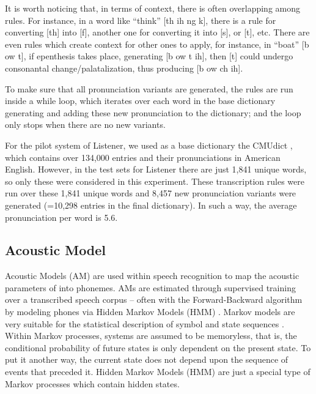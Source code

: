 \documentclass[twocolumn]{bmcart}%
\begin{document}
It is worth noticing that, in terms of context, there is often overlapping among rules. For instance, in a word like ``think'' [th ih ng k], there is a rule for converting [th] into [f], another one for converting it into [s], or [t], etc. There are even rules which create context for other ones to apply, for instance, in ``boat'' [b ow t], if epenthesis takes place, generating [b ow t ih], then [t] could undergo consonantal change/palatalization, thus producing [b ow ch ih].

To make sure that all pronunciation variants are generated, the rules are run inside a while loop, which iterates over each word in the base dictionary generating and adding these new pronunciation to the dictionary; and the loop only stops when there are no new variants.

For the pilot system of Listener, we used as a base dictionary the CMUdict \cite{CMUDict2008}, which contains over 134,000 entries and their pronunciations in American English. However, in the test sets for Listener there are just 1,841 unique words, so only these were considered in this experiment. These transcription rules were run over these 1,841 unique words and 8,457 new pronunciation variants were generated (=10,298 entries in the final dictionary). In such a way, the average pronunciation per word is 5.6. 

\subsection*{\textbf{Acoustic Model}}

Acoustic Models (AM) are used within speech recognition to map the acoustic parameters of into phonemes.  AMs are estimated through supervised training over a transcribed speech corpus -- often with the Forward-Backward algorithm by modeling phones via Hidden Markov Models (HMM) \cite{Rabiner1989}. Markov models are very suitable for the statistical description of symbol and state sequences \cite{Fink2014}. Within Markov processes, systems are assumed to be memoryless, that is, the conditional probability of future states is only dependent on the present state. To put it another way, the current state does not depend upon the 
sequence of events that preceded it. Hidden Markov Models (HMM) are just a special type of Markov processes which contain hidden states.
\end{document}
